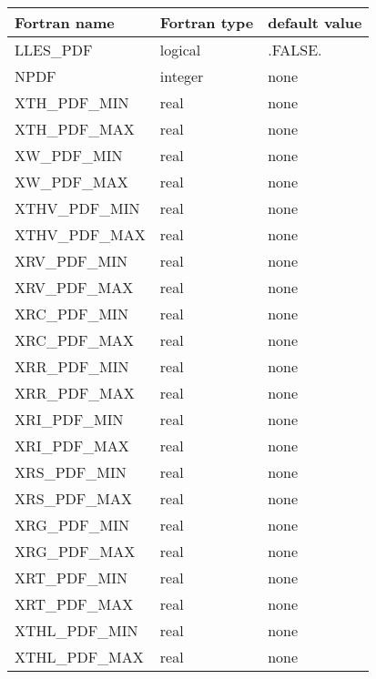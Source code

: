 \begin{center}
\begin{tabular} {|l|l|l|}
\hline
Fortran name & Fortran type & default value \\
\hline
LLES\_PDF                     &  logical          & .FALSE.  \\
NPDF                          & integer           & none \\
XTH\_PDF\_MIN                 & real              & none \\
XTH\_PDF\_MAX                 & real              & none \\
XW\_PDF\_MIN                  & real              & none \\
XW\_PDF\_MAX                  & real              & none \\
XTHV\_PDF\_MIN                 & real              & none \\
XTHV\_PDF\_MAX                 & real              & none \\
XRV\_PDF\_MIN                 & real              & none \\
XRV\_PDF\_MAX                 & real              & none \\
XRC\_PDF\_MIN                 & real              & none \\
XRC\_PDF\_MAX                 & real              & none \\
XRR\_PDF\_MIN                 & real              & none \\
XRR\_PDF\_MAX                 & real              & none \\
XRI\_PDF\_MIN                 & real              & none \\
XRI\_PDF\_MAX                 & real              & none \\
XRS\_PDF\_MIN                 & real              & none \\
XRS\_PDF\_MAX                 & real              & none \\
XRG\_PDF\_MIN                 & real              & none \\
XRG\_PDF\_MAX                 & real              & none \\
XRT\_PDF\_MIN                 & real              & none \\
XRT\_PDF\_MAX                 & real              & none \\
XTHL\_PDF\_MIN                 & real              & none \\
XTHL\_PDF\_MAX                 & real              & none \\
\hline
\end{tabular}
\end{center}

